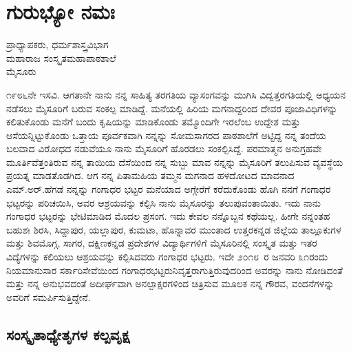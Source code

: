 {\fontsize{14}{16}\selectfont
\chapter{ಗುರುಭ್ಯೋ ನಮಃ}

\begin{center}
\smallskip

ಪ್ರಾಧ್ಯಾಪಕರು, ಧರ್ಮಶಾಸ್ತ್ರವಿಭಾಗ\\ 
ಮಹಾರಾಜ ಸಂಸ್ಕೃತಮಹಾಪಾಠಶಾಲೆ\\ 
ಮೈಸೂರು
\addrule
\end{center}

೧೯೮೬ನೇ ಇಸವಿ. ಆಗತಾನೇ ನಾನು ನನ್ನ ಸಾಹಿತ್ಯ ತರಗತಿಯ \hbox{ವ್ಯಾಸಂಗವನ್ನು} ಮುಗಿಸಿ ವಿದ್ವತ್ತರಗತಿಯಲ್ಲಿ ಅಧ್ಯಯನ ನಡೆಸಲು ಮೈಸೂರಿಗೆ ಬರುವ ಸಂಕಲ್ಪ ಮಾಡಿದ್ದೆ. ಮನೆಯಲ್ಲಿ ಹಿರಿಯ ಮಗನಾದ್ದರಿಂದ ದೇವರ ಪೂಜಾವಿಧಿಗಳನ್ನು ಕಲಿತು\-ಕೊಂಡು ಮನೆಗೆ ಬಂದು ಕೃಷಿಯನ್ನು ಮಾಡಿಕೊಂಡು ತಮ್ಮೊಂದಿಗೇ ಇರಲೆಂಬ ಉದ್ದೇಶ ಮತ್ತು ಆಸೆಯನ್ನಿಟ್ಟುಕೊಂಡು ಒತ್ತಾಯ ಪೂರ್ವಕವಾಗಿ ನನ್ನನ್ನು ಸೋಮಸಾಗರದ ಪಾಠಶಾಲೆಗೆ ಅಟ್ಟಿದ್ದ ನನ್ನ ತಂದೆಯ ಬಲವಾದ ವಿರೋಧದ ನಡುವೆಯೂ ನಾನು ಮೈಸೂರಿಗೆ ಹೊರಡಲು ಸಂಕಲ್ಪಿಸಿದ್ದೆ. ಪರಮಾತ್ಮನ ಅನುಗ್ರಹವೇ ಮೂರ್ತಿವೆತ್ತಂತಿರುವ ನನ್ನ ತಾಯಿಯ ದೆಸೆಯಿಂದ ನನ್ನ ಸುಬ್ಬು ಮಾವ ನನ್ನನ್ನು ಮೈಸೂರಿಗೆ ತಲುಪಿಸುವ ವ್ಯವಸ್ಥೆಯ ಪ್ರಯತ್ನ ಮಾಡತೊಡಗಿದ. ಆಗ ನನ್ನ ಪಿತಾಮಹಿಯ ತಮ್ಮನ ಮಗನಾದ ಹಳದೋಟದ ಮಾವನಾದ ಎಮ್.ಅರ್.ಹೆಗಡೆ ನನ್ನನ್ನು ಗಂಗಾಧರ ಭಟ್ಟರ ಮನೆಯಾದ ಅಗ್ಗೇರೆಗೆ ಕರೆದುಕೊಂಡು ಹೊಗಿ ನನಗೆ ಗಂಗಾಧರ ಭಟ್ಟರನ್ನು ಪರಿಚಯಿಸಿ, ಅವರ ಆಶ್ರಯವನ್ನು ಕಲ್ಪಿಸಿ ನಾನು ಮೈಸೂರನ್ನು ತಲುಪುವಂತಾಯಿತು. ಇದು ನಾನು ಗಂಗಾಧರ ಭಟ್ಟರನ್ನು ಭೇಟಿಮಾಡಿದ ಮೊದಲ ಪ್ರಸಂಗ. ಇದು ಕೇವಲ ನನ್ನೊಬ್ಬನ ಕಥೆಯಲ್ಲ. ಹೀಗೇ ನನ್ನಂತಹ ಬಹುಶಃ ಶಿರಸಿ, ಸಿದ್ದಾಪುರ, ಯಲ್ಲಾಪುರ, ಕುಮಟಾ, ಹೊನ್ನಾವರ ಮುಂತಾದ ಉತ್ತರಕನ್ನಡ ಜಿಲ್ಲೆಯ ತಾಲ್ಲೂಕುಗಳ ಮತ್ತು ಶಿವಮೊಗ್ಗ, ಸಾಗರ, ದಕ್ಷಿಣ\-ಕನ್ನಡ ಪ್ರದೇಶಗಳ ವಿದ್ಯಾರ್ಥಿಗಳಿಗೆ ಮೈಸೂರಿನಲ್ಲಿ ಸಂಸ್ಕೃತ ಮತ್ತು ಇತರ ವಿದ್ಯೆಗಳನ್ನು ಕಲಿಯಲು ಆಶ್ರಯವನ್ನು ಕಲ್ಪಿಸಿದವರು ಗಂಗಾಧರ ಭಟ್ಟರು. ಇದೇ ೨೦೧೮~ರ ಜನವರಿ ೩೧ರಂದು ನಿಯಮಾನುಸಾರ ಸರ್ಕಾರಿಸೇವೆಯಿಂದ ಗಂಗಾಧರಭಟ್ಟರು\break ನಿವೃತ್ತರಾಗುತ್ತಿರುವುದರಿಂದ ಅವರನ್ನು ನಾನು ನೋಡಿದಂತೆ ಮತ್ತು ನನ್ನ ಅನುಭವದಂತೆ ಅದೀರ್ಘವಾಗಿ ಅನಲ್ಪಾಕ್ಷರಗಳಿಂದ ಚಿತ್ರಿಸುವ ಮೂಲಕ ನನ್ನ ಗೌರವ, ವಂದನೆ\-ಗಳನ್ನು ಅವರಿಗೆ ಸಮರ್ಪಿಸುತ್ತಿದ್ದೇನೆ.

\section*{ಸಂಸ್ಕೃತಾಧ್ಯೇತೃಗಳ ಕಲ್ಪವೃಕ್ಷ}

}
